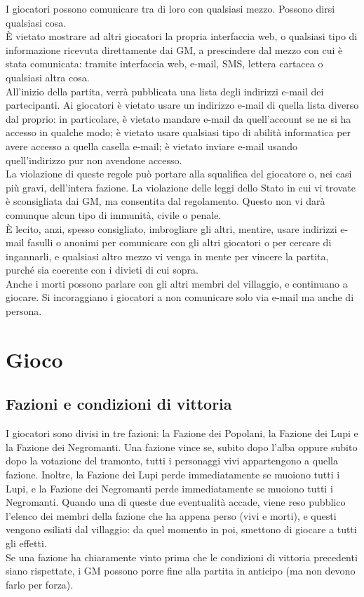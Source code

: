 \documentclass[a4paper,10pt]{article}
\begin{document}
I giocatori possono comunicare tra di loro con qualsiasi mezzo. Possono dirsi
qualsiasi cosa.\\
È vietato mostrare ad altri giocatori la propria interfaccia web, o qualsiasi
tipo di informazione ricevuta direttamente dai GM, a prescindere dal mezzo con 
cui è stata comunicata: tramite interfaccia web, e-mail, SMS, lettera cartacea
o qualsiasi altra cosa.\\
All'inizio della partita, verrà pubblicata una lista degli indirizzi e-mail dei
partecipanti. Ai giocatori è vietato usare un indirizzo e-mail
di quella lista diverso dal proprio: in particolare, è vietato mandare e-mail da
quell'account se ne si ha accesso in qualche modo; è vietato
usare qualsiasi tipo di abilità informatica per avere accesso a quella casella
e-mail; è vietato inviare e-mail usando quell'indirizzo pur non
avendone accesso.\\
La violazione di queste regole può portare alla squalifica
del giocatore o, nei casi più gravi, dell'intera fazione.
La violazione delle leggi dello Stato in cui vi trovate è sconsigliata dai GM,
ma consentita dal regolamento. Questo non vi darà comunque alcun tipo di
immunità, civile o penale.\\
È lecito, anzi, spesso consigliato, imbrogliare gli altri, mentire, usare
indirizzi e-mail fasulli o anonimi per comunicare con gli altri giocatori o per
cercare di ingannarli, e qualsiasi altro mezzo vi venga in mente per vincere la
partita, purché sia coerente con i divieti di cui sopra.\\
Anche i morti possono parlare con gli altri membri del villaggio, e continuano a
giocare. Si incoraggiano i giocatori a non comunicare solo via e-mail ma anche
di persona.


\pagebreak
\section{Gioco}


\subsection{Fazioni e condizioni di vittoria}

I giocatori sono divisi in tre fazioni: la Fazione dei Popolani, la Fazione dei
Lupi e la Fazione dei Negromanti.
Una fazione vince se, subito dopo l'alba oppure subito dopo la votazione del
tramonto, tutti i personaggi vivi appartengono a quella fazione.
Inoltre, la Fazione dei Lupi perde immediatamente se muoiono tutti i Lupi, e la
Fazione dei Negromanti perde immediatamente se muoiono tutti i Negromanti.
Quando una di queste due eventualità accade, viene reso pubblico l'elenco dei
membri della fazione che ha appena perso (vivi e morti), e questi vengono
esiliati dal villaggio: da quel momento in poi, smettono di giocare a tutti gli
effetti.
\\
Se una fazione ha chiaramente vinto prima che le condizioni di vittoria
precedenti siano rispettate, i GM possono porre fine alla partita in anticipo
(ma non devono farlo per forza).
\end{document}
